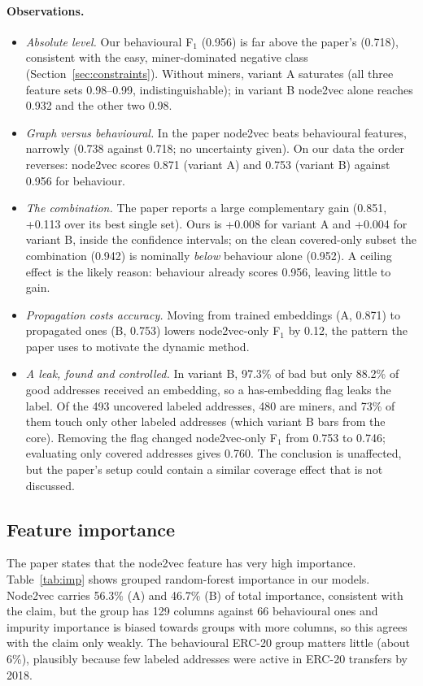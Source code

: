 \paragraph{Observations.}
\begin{itemize}
\item \emph{Absolute level.} Our behavioural F$_1$ (0.956) is far above the paper's (0.718), consistent with the easy, miner-dominated negative class (Section~\ref{sec:constraints}). Without miners, variant A saturates (all three feature sets 0.98--0.99, indistinguishable); in variant B node2vec alone reaches 0.932 and the other two 0.98.
\item \emph{Graph versus behavioural.} In the paper node2vec beats behavioural features, narrowly (0.738 against 0.718; no uncertainty given). On our data the order reverses: node2vec scores 0.871 (variant A) and 0.753 (variant B) against 0.956 for behaviour.
\item \emph{The combination.} The paper reports a large complementary gain (0.851, +0.113 over its best single set). Ours is +0.008 for variant A and +0.004 for variant B, inside the confidence intervals; on the clean covered-only subset the combination (0.942) is nominally \emph{below} behaviour alone (0.952). A ceiling effect is the likely reason: behaviour already scores 0.956, leaving little to gain.
\item \emph{Propagation costs accuracy.} Moving from trained embeddings (A, 0.871) to propagated ones (B, 0.753) lowers node2vec-only F$_1$ by 0.12, the pattern the paper uses to motivate the dynamic method.
\item \emph{A leak, found and controlled.} In variant B, 97.3\% of bad but only 88.2\% of good addresses received an embedding, so a has-embedding flag leaks the label. Of the 493 uncovered labeled addresses, 480 are miners, and 73\% of them touch only other labeled addresses (which variant B bars from the core). Removing the flag changed node2vec-only F$_1$ from 0.753 to 0.746; evaluating only covered addresses gives 0.760. The conclusion is unaffected, but the paper's setup could contain a similar coverage effect that is not discussed.
\end{itemize}

\subsection{Feature importance}
The paper states that the node2vec feature has very high importance. Table~\ref{tab:imp} shows grouped random-forest importance in our models. Node2vec carries 56.3\% (A) and 46.7\% (B) of total importance, consistent with the claim, but the group has 129 columns against 66 behavioural ones and impurity importance is biased towards groups with more columns, so this agrees with the claim only weakly. The behavioural ERC-20 group matters little (about 6\%), plausibly because few labeled addresses were active in ERC-20 transfers by 2018.
\begin{table}[H]
\centering\footnotesize\singlespacing

\caption{Grouped random-forest importance (combined feature set).}
\label{tab:imp}
\end{table}

